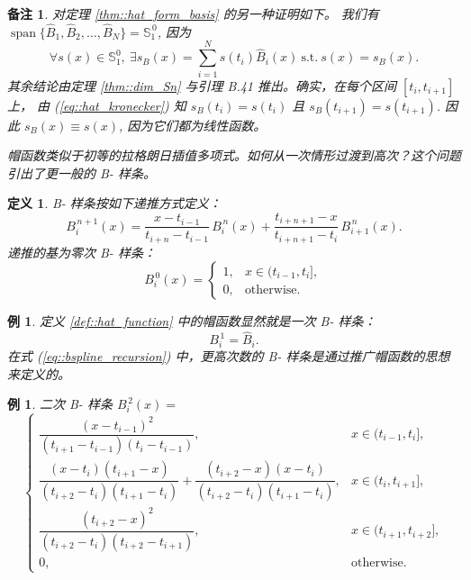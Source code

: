 \documentclass[a4paper]{ctexart}
\newtheorem{remark}{备注}
\newtheorem{definition}[theorem]{定义} %
\newtheorem{example}[theorem]{例}
\numberwithin{theorem}{section}
\numberwithin{equation}{section}
\numberwithin{figure}{section}
\numberwithin{remark}{section}
\begin{document}
\begin{remark}
    \label{rem::alt_proof_hat_basis}
对定理 \ref{thm::hat_form_basis} 的另一种证明如下。
我们有 $\operatorname{span}\{\hat{B}_1,\hat{B}_2,\ldots,\hat{B}_N\}=\mathbb{S}^{\,0}_{1}$, 因为
\[
\forall s(x)\in \mathbb{S}^{0}_{1},\ \exists s_B(x)=\sum_{i=1}^{N} s(t_i)\hat{B}_i(x)\ \text{s.t.}\ s(x)=s_B(x).
\]
其余结论由定理 \ref{thm::dim_Sn} 与引理 B.41 推出。确实，在每个区间 $[t_i,t_{i+1}]$ 上，
由 (\ref{eq::hat_kronecker}) 知 $s_B(t_i)=s(t_i)$ 且 $s_B(t_{i+1})=s(t_{i+1})$. 因此 $s_B(x)\equiv s(x)$, 
因为它们都为线性函数。

帽函数类似于初等的拉格朗日插值多项式。如何从一次情形过渡到高次？这个问题引出了更一般的 B- 样条。
\end{remark}

\begin{definition}
    \label{def::bspline_recursive}
B- 样条按如下递推方式定义：
\begin{equation}
\label{eq::bspline_recursion}
B^{\,n+1}_i(x)=
\frac{x-t_{i-1}}{t_{i+n}-t_{i-1}}\,B^{\,n}_i(x)
+\frac{t_{i+n+1}-x}{t_{i+n+1}-t_i}\,B^{\,n}_{i+1}(x).
\end{equation}
递推的基为零次 B- 样条：
\begin{equation}
\label{eq::bspline_degree0}
B^{\,0}_i(x)=
\begin{cases}
1, & x\in(t_{i-1},t_i],\\
0, & \text{otherwise}.
\end{cases}
\end{equation}
\end{definition}

\begin{example}
    \label{ex::hat_is_degree1_bspline}
定义 \ref{def::hat_function} 中的帽函数显然就是一次 B- 样条：
\begin{equation}
\label{eq::B1_equals_hat}
B^{\,1}_i=\hat{B}_i.
\end{equation}
在式 (\ref{eq::bspline_recursion}) 中，更高次数的 B- 样条是通过推广帽函数的思想来定义的。
\end{example}

\begin{example}
    \label{ex::quadratic_bspline_formula}
二次 B- 样条 $B^{\,2}_i(x)=$
\begin{equation}
\label{eq::quadratic_bspline}
\begin{cases}
\dfrac{(x-t_{i-1})^{2}}{(t_{i+1}-t_{i-1})(t_i-t_{i-1})}, & x\in(t_{i-1},t_i],\\[8pt]
\dfrac{(x-t_i)(t_{i+1}-x)}{(t_{i+2}-t_i)(t_{i+1}-t_i)}
+\dfrac{(t_{i+2}-x)(x-t_i)}{(t_{i+2}-t_i)(t_{i+1}-t_i)}, & x\in(t_i,t_{i+1}],\\[8pt]
\dfrac{(t_{i+2}-x)^{2}}{(t_{i+2}-t_i)(t_{i+2}-t_{i+1})}, & x\in(t_{i+1},t_{i+2}],\\[8pt]
0, & \text{otherwise}.
\end{cases}
\end{equation}
\end{example}
\end{document}
